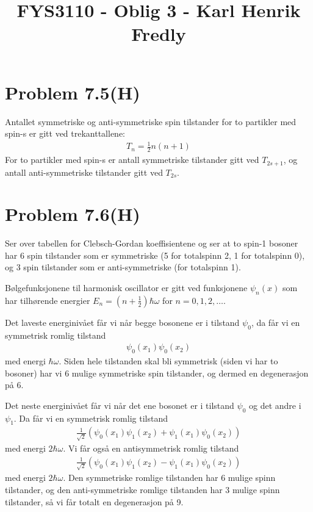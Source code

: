 \documentclass[norsk,a4paper,12pt]{article}
\title{FYS3110 - Oblig 3 - Karl Henrik Fredly}
\begin{document}
	
	\maketitle
	
\section*{Problem 7.5(H)}

	Antallet symmetriske og anti-symmetriske spin tilstander for to partikler med spin-s er gitt ved trekanttallene:
	\begin{equation}
	\begin{aligned}
	T_n = \frac{1}{2} n (n + 1)
	\end{aligned}
	\end{equation}
	For to partikler med spin-s er antall symmetriske tilstander gitt ved $T_{2s + 1}$, og antall anti-symmetriske tilstander gitt ved $T_{2s}$.

	
\section*{Problem 7.6(H)}

	Ser over tabellen for Clebsch-Gordan koeffisientene og ser at to spin-1 bosoner har 6 spin tilstander som er symmetriske (5 for totalspinn 2, 1 for totalspinn 0), og 3 spin tilstander som er anti-symmetriske (for totalspinn 1).

	Bølgefunksjonene til harmonisk oscillator er gitt ved funksjonene $\psi_n(x)$ som har tilhørende energier $E_n = (n + \frac{1}{2})\hbar \omega$ for $n = 0,1,2,\dots$.
	
	Det laveste energinivået får vi når begge bosonene er i tilstand $\psi_0$, da får vi en symmetrisk romlig tilstand
	\begin{equation}
	\begin{aligned}
	\psi_0(x_1)\psi_0(x_2)
	\end{aligned}
	\end{equation}
	med energi $\hbar \omega$. Siden hele tilstanden skal bli symmetrisk (siden vi har to bosoner) har vi 6 mulige symmetriske spin tilstander, og dermed en degenerasjon på 6. 
	
	Det neste energinivået får vi når det ene bosonet er i tilstand $\psi_0$ og det andre i $\psi_1$. Da får vi en symmetrisk romlig tilstand
	\begin{equation}
	\begin{aligned}
	\frac{1}{\sqrt{2}}(\psi_0(x_1)\psi_1(x_2) + \psi_1(x_1)\psi_0(x_2))
	\end{aligned}
	\end{equation}
	med energi $2\hbar \omega$. Vi får også en antisymmetrisk romlig tilstand
	\begin{equation}
	\begin{aligned}
	\frac{1}{\sqrt{2}}(\psi_0(x_1)\psi_1(x_2) - \psi_1(x_1)\psi_0(x_2))
	\end{aligned}
	\end{equation}
	med energi $2\hbar \omega$. Den symmetriske romlige tilstanden har 6 mulige spinn tilstander, og den anti-symmetriske romlige tilstanden har 3 mulige spinn tilstander, så vi får totalt en degenerasjon på 9.
	
\end{document}
